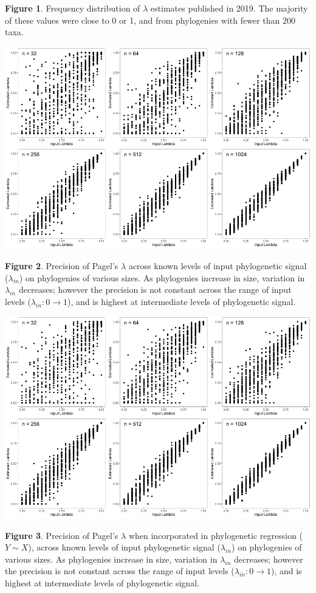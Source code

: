 \documentclass[
]{article}
\begin{document}
\singlespacing \textbf{Figure 1}. Frequency distribution of \(\lambda\)
estimates published in 2019. The majority of these values were close to
0 or 1, and from phylogenies with fewer than 200 taxa.

\newpage

\includegraphics[width=0.95\linewidth]{Fig2}

\singlespacing \textbf{Figure 2}. Precision of Pagel's \(\lambda\)
across known levels of input phylogenetic signal (\(\lambda_{in}\)) on
phylogenies of various sizes. As phylogenies increase in size, variation
in \(\lambda_{in}\) decreases; however the precision is not constant
across the range of input levels (\(\lambda_{in}: 0 \to 1\)), and is
highest at intermediate levels of phylogenetic signal.

\newpage

\includegraphics[width=0.95\linewidth]{Fig3}

\singlespacing \textbf{Figure 3}. Precision of Pagel's \(\lambda\) when
incorporated in phylogenetic regression (\(Y\sim X\)), across known
levels of input phylogenetic signal (\(\lambda_{in}\)) on phylogenies of
various sizes. As phylogenies increase in size, variation in
\(\lambda_{in}\) decreases; however the precision is not constant across
the range of input levels (\(\lambda_{in}: 0 \to 1\)), and is highest at
intermediate levels of phylogenetic signal.
\end{document}
